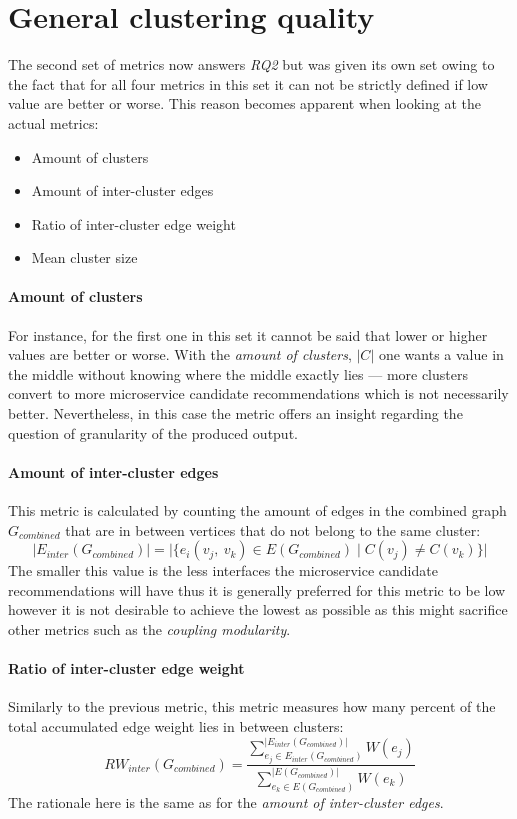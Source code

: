 \documentclass[12pt,a4paper]{report}
\begin{document}
\section{General clustering quality}

The second set of metrics now answers \textit{RQ2} but was given its own set
owing to the fact that for all four metrics in this set it can not be strictly
defined if low value are better or worse. This reason becomes apparent when
looking at the actual metrics:
\begin{itemize}[noitemsep]
  \item Amount of clusters
  \item Amount of inter-cluster edges
  \item Ratio of inter-cluster edge weight
  \item Mean cluster size
\end{itemize}

\paragraph{Amount of clusters}
For instance, for the first one in this set it cannot be said that lower or
higher values are better or worse. With the \textit{amount of clusters},
\(\vert C \vert\) one wants a value in the middle without knowing where
the middle exactly lies --- more clusters convert to more microservice
candidate recommendations which is not necessarily better.
Nevertheless, in this case the metric offers an insight regarding the question
of granularity of the produced output.

\paragraph{Amount of inter-cluster edges}
This metric is calculated by counting the amount of edges in the combined graph
\(G_{combined}\) that are in between vertices that do not belong to the same cluster:
\[
  \vert E_{inter}(G_{combined}) \vert =
  \vert \{ e_i(v_j, \ v_k) \in E(G_{combined}) \mid C(v_j) \neq C(v_k) \} \vert
\]
The smaller this value is the less interfaces the microservice candidate
recommendations will have thus it is generally preferred for this metric to be
low however it is not desirable to achieve the lowest as possible as this
might sacrifice other metrics such as the \textit{coupling modularity}.

\paragraph{Ratio of inter-cluster edge weight}
Similarly to the previous metric, this metric measures how many percent
of the total accumulated edge weight lies in between clusters:
\[
  RW_{inter}(G_{combined}) =
  \frac{
    \sum_{e_j \in E_{inter}(G_{combined})}^{\vert E_{inter}(G_{combined}) \vert} W(e_j)
  }{
    \sum_{e_k \in E(G_{combined})}^{\vert E(G_{combined}) \vert} W(e_k)
  }
\]
The rationale here is the same as for the \textit{amount of inter-cluster edges}.
\end{document}
